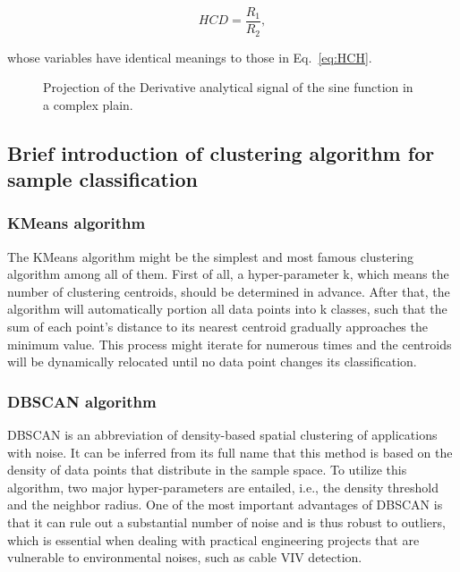 \documentclass[preprint, 3p, times, compress, 11pt]{elsarticle}
\begin{document}
\begin{equation}
    HCD = \frac{R_1}{R_2},
    \label{eq:HCD}
\end{equation}

whose variables have identical meanings to those in Eq.~\eqref{eq:HCH}.

\begin{figure}[ht]
    \centering
    \qquad
    \caption{Projection of the Derivative analytical signal of the sine 
            function in a complex plain.}
    \label{fig:proj_deri}
\end{figure}

\subsection{Brief introduction of clustering algorithm for sample classification} 

\subsubsection{KMeans algorithm}

The KMeans algorithm might be the simplest and most famous clustering 
algorithm among all of them. First of all, a hyper-parameter k, which 
means the number of clustering centroids, should be determined in advance. 
After that, the algorithm will automatically portion all data points 
into k classes, such that the sum of each point's distance to its 
nearest centroid gradually approaches the minimum value. This process 
might iterate for numerous times and the centroids will be dynamically 
relocated until no data point changes its classification.

\subsubsection{DBSCAN algorithm}

DBSCAN is an abbreviation of density-based spatial clustering of 
applications with noise. It can be inferred from its full name that this 
method is based on the density of data points that distribute in the 
sample space. To utilize this algorithm, two major hyper-parameters are 
entailed, i.e., the density threshold and the neighbor radius. One of the 
most important advantages of DBSCAN is that it can rule out a substantial 
number of noise and is thus robust to outliers, which is essential when 
dealing with practical engineering projects that are vulnerable to 
environmental noises, such as cable VIV detection. 
\end{document}
